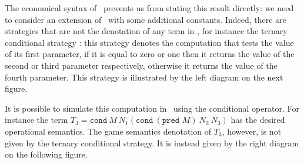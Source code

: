 The economical syntax of \pcf\ prevents us from stating this result
directly: we need to consider an extension of \pcf\ with some
additional constants. Indeed, there are strategies that are not the
denotation of any term in \pcf, for instance the ternary conditional
strategy : this strategy denotes the computation that tests the
value of its first parameter, if it is equal to zero or one then it
returns the value of the second or third parameter respectively,
otherwise it returns the value of the fourth parameter. This
strategy is illustrated by the left diagram on the next figure.

It is possible to simulate this computation in \pcf\ using the
conditional operator. For instance the term $T_3 = \texttt{cond}\ M\
N_1 (\texttt{cond}\ (\texttt{pred } M)\  N_2\ N_3)$ has the desired
operational semantics. The game semantics denotation of
$T_3$, however, is not given by the ternary conditional strategy. It is
instead given by the right diagram on the following figure.

